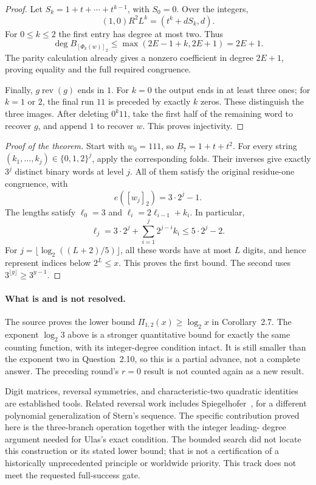 \documentclass[11pt,a4paper]{article}
\theoremstyle{definition}
\theoremstyle{remark}
\begin{document}
\begin{proof}
Let $S_k=1+t+\cdots+t^{k-1}$, with $S_0=0$. Over the integers,
\[
 (1,0)R^2L^k=(t^k+dS_k,d).
\]
For $0\le k\le2$ the first entry has degree at most two. Thus
\[
 \deg B_{[\Phi_k(w)]_2}
 \le\max(2E-1+k,2E+1)=2E+1.
\]
The parity calculation already gives a nonzero coefficient in degree
$2E+1$, proving equality and the full required congruence.

Finally, $g\operatorname{rev}(g)$ ends in $1$. For $k=0$ the output
ends in at least three ones; for $k=1$ or $2$, the final run $11$ is
preceded by exactly $k$ zeros. These distinguish the three images.
After deleting $0^k11$, take the first half of the remaining word to
recover $g$, and append $1$ to recover $w$. This proves injectivity.
\end{proof}

\begin{proof}[Proof of the theorem]
Start with $w_0=111$, so $B_7=1+t+t^2$. For every string
$(k_1,\ldots,k_j)\in\{0,1,2\}^j$, apply the corresponding folds.
Their inverses give exactly $3^j$ distinct binary words at level $j$.
All of them satisfy the original residue-one congruence, with
\[
 e([w_j]_2)=3\cdot2^j-1.
\]
The lengths satisfy $\ell_0=3$ and
$\ell_i=2\ell_{i-1}+k_i$. In particular,
\[
 \ell_j=3\cdot2^j+\sum_{i=1}^j2^{j-i}k_i
 \le5\cdot2^j-2.
\]
For $j=\lfloor\log_2((L+2)/5)\rfloor$, all these words have at
most $L$ digits, and hence represent indices below $2^L\le x$.
This proves the first bound. The second uses
$3^{\lfloor y\rfloor}\ge3^{y-1}$.
\end{proof}

\paragraph{What is and is not resolved.}
The source proves the lower bound $\Pi_{1,2}(x)\ge\log_2x$ in
Corollary~2.7. The exponent $\log_2 3$ above is a stronger quantitative
bound for exactly the same counting function, with its integer-degree
condition intact. It is still smaller than the exponent two in
Question~2.10, so this is a partial advance, not a complete answer.
The preceding round's $r=0$ result is not counted again as a new result.

Digit matrices, reversal symmetries, and characteristic-two quadratic
identities are established tools. Related reversal work includes
Spiegelhofer~\cite{t96:spiegelhofer}, for a different polynomial
generalization of Stern's sequence. The specific contribution proved
here is the three-branch operation together with the integer leading-
degree argument needed for Ulas's exact condition. The bounded search
did not locate this construction or its stated lower bound; that is not
a certification of a historically unprecedented principle or worldwide
priority. This track does not meet the requested full-success gate.
\end{document}
